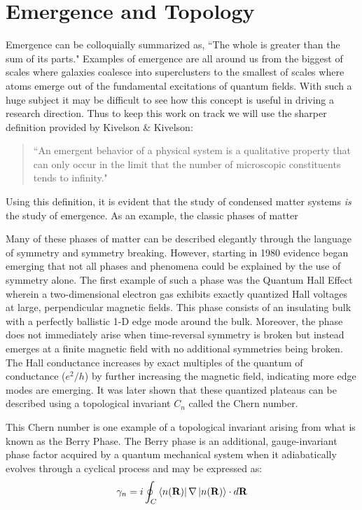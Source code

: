 \section{Emergence and Topology}
Emergence can be colloquially summarized as, ``The whole is greater than the sum of its parts." Examples of emergence are all around us from the biggest of scales where galaxies coalesce into superclusters to the smallest of scales where atoms emerge out of the fundamental excitations of quantum fields. With such a huge subject it may be difficult to see how this concept is useful in driving a research direction. Thus to keep this work on track we will use the sharper definition provided by Kivelson \& Kivelson:
\begin{quote}
	``An emergent behavior of a physical system is a qualitative property that can only occur in the limit that the number of microscopic constituents tends to infinity."\cite{Kivelson2016}
\end{quote}
Using this definition, it is evident that the study of condensed matter systems \textit{is} the study of emergence. As an example, the classic phases of matter 
\par 
Many of these phases of matter can be described elegantly through the language of symmetry and symmetry breaking\cite{Noether1918, Landau1937, pathria_beale_2022}. However, starting in 1980 evidence began emerging that not all phases and phenomena could be explained by the use of symmetry alone. The first example of such a phase was the Quantum Hall Effect wherein a two-dimensional electron gas exhibits exactly quantized Hall voltages at large, perpendicular magnetic fields\cite{Klitzing1980}. This phase consists of an insulating bulk with a perfectly ballistic 1-D edge mode around the bulk. Moreover, the phase does not immediately arise when time-reversal symmetry is broken but instead emerges at a finite magnetic field with no additional symmetries being broken. The Hall conductance increases by exact multiples of the quantum of conductance ($e^{2}/h$) by further increasing the magnetic field, indicating more edge modes are emerging\cite{Zhang2005}. It was later shown that these quantized plateaus can be described using a topological invariant $C_{n}$ called the Chern number.\cite{Thouless1982, Kohmoto1985, Avron1983, Niu1985}\par 
This Chern number is one example of a topological invariant arising from what is known as the Berry Phase\cite{Berry1984}. The Berry phase is an additional, gauge-invariant phase factor acquired by a quantum mechanical system when it adiabatically evolves through a cyclical process and may be expressed as:
\begin{align}
	\gamma_{n} = i\oint_{C}\bra{n(\textbf{R})}\nabla\ket{n(\textbf{R})}\cdot d\textbf{R}
\end{align}

